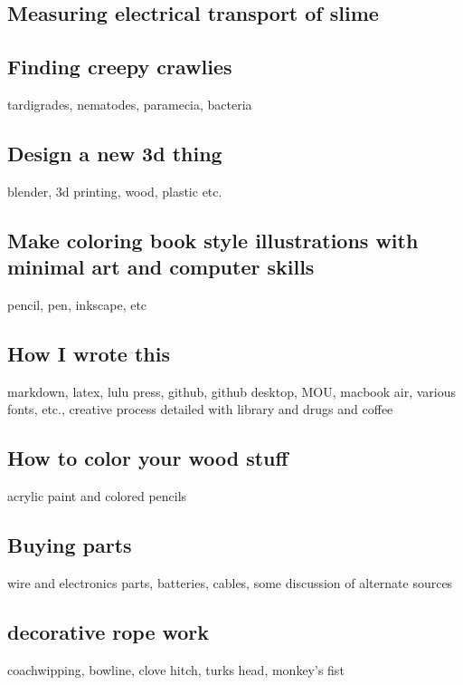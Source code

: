 \subsection{Measuring electrical transport of
slime}\label{measuring-electrical-transport-of-slime}

\subsection{Finding creepy crawlies}\label{finding-creepy-crawlies}

tardigrades, nematodes, paramecia, bacteria

\subsection{Design a new 3d thing}\label{design-a-new-3d-thing}

blender, 3d printing, wood, plastic etc.

\subsection{Make coloring book style illustrations with minimal art and
computer
skills}\label{make-coloring-book-style-illustrations-with-minimal-art-and-computer-skills}

pencil, pen, inkscape, etc

\subsection{How I wrote this}\label{how-i-wrote-this}

markdown, latex, lulu press, github, github desktop, MOU, macbook air,
various fonts, etc., creative process detailed with library and drugs
and coffee

\subsection{How to color your wood
stuff}\label{how-to-color-your-wood-stuff}

acrylic paint and colored pencils

\subsection{Buying parts}\label{buying-parts}

wire and electronics parts, batteries, cables, some discussion of
alternate sources

\subsection{decorative rope work}\label{decorative-rope-work}

coachwipping, bowline, clove hitch, turks head, monkey's fist
